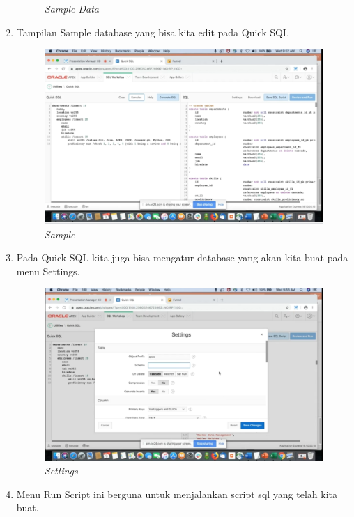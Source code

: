 \begin{enumerate}
\begin{figure}[H]
    \caption{\textit{Sample Data}}
    \label{foto20}
\end{figure}
\item Tampilan Sample database yang bisa kita edit pada Quick SQL
 \begin{figure}[H]
    \centering
    \includegraphics[scale=0.5]{figures/u}
    \caption{\textit{Sample}}
    \label{foto21}
\end{figure}
\item Pada Quick SQL kita juga bisa mengatur database yang akan kita buat pada menu Settings.
 \begin{figure}[H]
    \centering
    \includegraphics[scale=0.5]{figures/v}
    \caption{\textit{Settings}}
    \label{foto22}
\end{figure}
\item Menu Run Script ini berguna untuk menjalankan script sql yang telah kita buat.
 \begin{figure}[H]
    \centering

\end{figure}
\end{enumerate}
